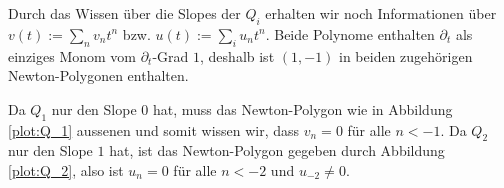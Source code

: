 Durch das Wissen über die Slopes der $Q_i$
erhalten wir noch Informationen über $v(t):=\sum_n v_nt^n$ bzw. $u(t):=\sum_i
u_nt^n$. Beide Polynome enthalten $\partial_t$ als einziges Monom vom
$\partial_t$-Grad $1$, deshalb ist $(1,-1)$ in beiden zugehörigen
Newton-Polygonen enthalten.

Da $Q_1$ nur den Slope $0$ hat, muss das Newton-Polygon wie in Abbildung
\ref{plot:Q_1} aussenen und somit wissen wir, dass $v_n=0$ für alle $n<-1$.
Da $Q_2$ nur den Slope $1$ hat, ist das Newton-Polygon gegeben durch Abbildung
\ref{plot:Q_2}, also ist $u_n=0$ für alle $n<-2$ und $u_{-2}\neq0$.
\begin{figure}[htbp]
\end{figure}

